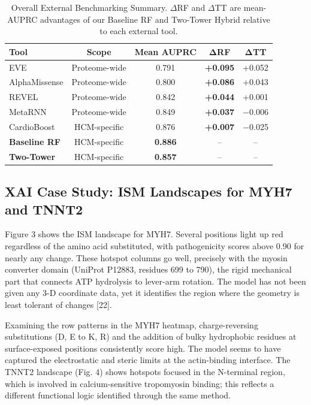 \documentclass[conference]{IEEEtran}
\begin{document}
\begin{table}[h]
\centering
\caption{Overall External Benchmarking Summary. $\Delta$RF and
$\Delta$TT are mean-AUPRC advantages of our Baseline RF and
Two-Tower Hybrid relative to each external tool.}
\label{tab:bench_summary}
\begin{tabular}{lcccc}
\toprule
\textbf{Tool} & \textbf{Scope} & \textbf{Mean AUPRC} &
  $\boldsymbol{\Delta}$\textbf{RF} & $\boldsymbol{\Delta}$\textbf{TT} \\
\midrule
EVE             & Proteome-wide & 0.791 & \textbf{+0.095} & +0.052 \\
AlphaMissense   & Proteome-wide & 0.800 & \textbf{+0.086} & +0.043 \\
REVEL           & Proteome-wide & 0.842 & \textbf{+0.044} & +0.001 \\
MetaRNN         & Proteome-wide & 0.849 & \textbf{+0.037} & $-$0.006 \\
CardioBoost     & HCM-specific  & 0.876 & \textbf{+0.007} & $-$0.025 \\
\midrule
\textbf{Baseline RF}   & HCM-specific & \textbf{0.886} &  --  &  --  \\
\textbf{Two-Tower}     & HCM-specific & \textbf{0.857} &  --  &  --  \\
\bottomrule
\end{tabular}
\end{table}

\subsection{XAI Case Study: ISM Landscapes for MYH7 and TNNT2}

Figure 3 shows the ISM landscape for MYH7. Several positions light up red regardless of the amino acid substituted, with pathogenicity scores above 0.90 for nearly any change. These hotspot columns go well, precisely with the myosin converter domain (UniProt P12883, residues 699 to 790), the rigid mechanical part that connects ATP hydrolysis to lever-arm rotation. The model has not been given any 3-D coordinate data, yet it identifies the region where the geometry is least tolerant of changes [22].

Examining the row patterns in the MYH7 heatmap, charge-reversing substitutions (D, E to K, R) and the addition of bulky hydrophobic residues at surface-exposed positions consistently score high. The model seems to have captured the electrostatic and steric limits at the actin-binding interface. The TNNT2 landscape (Fig. 4) shows hotspots focused in the N-terminal region, which is involved in calcium-sensitive tropomyosin binding; this reflects a different functional logic identified through the same method.
\end{document}
